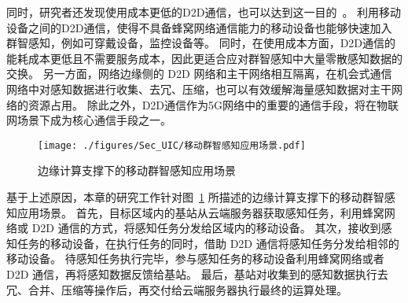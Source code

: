 同时，研究者还发现使用成本更低的D2D通信，也可以达到这一目的~\cite{DBLP:journals/puc/WangLL17}。
利用移动设备之间的D2D通信，使得不具备蜂窝网络通信能力的移动设备也能够快速加入群智感知，例如可穿戴设备，监控设备等。
同时，在使用成本方面，D2D通信的能耗成本更低且不需要服务成本，因此更适合应对群智感知中大量零散感知数据的交换。
另一方面，网络边缘侧的 D2D 网络和主干网络相互隔离，在机会式通信网络中对感知数据进行收集、去冗、压缩，也可以有效缓解海量感知数据对主干网络的资源占用。
除此之外，D2D通信作为5G网络中的重要的通信手段，将在物联网场景下成为核心通信手段之一。


\begin{figure}[!b]
  \centering
  \vspace{-1em}
  \texttt{[image: ./figures/Sec\_UIC/移动群智感知应用场景.pdf]}
  \vspace{-0.5em}
  \caption{边缘计算支撑下的移动群智感知应用场景}
  \vspace{-1em}
  \label{Figure_UIC_MCS}
\end{figure}

基于上述原因，本章的研究工作针对图~\ref{Figure_UIC_MCS} 所描述的边缘计算支撑下的移动群智感知应用场景。
首先，目标区域内的基站从云端服务器获取感知任务，利用蜂窝网络或 D2D 通信的方式，将感知任务分发给区域内的移动设备。
其次，接收到感知任务的移动设备，在执行任务的同时，借助 D2D 通信将感知任务分发给相邻的移动设备。
待感知任务执行完毕，参与感知任务的移动设备利用蜂窝网络或者 D2D 通信，再将感知数据反馈给基站。
最后，基站对收集到的感知数据执行去冗、合并、压缩等操作后，再交付给云端服务器执行最终的运算处理。


